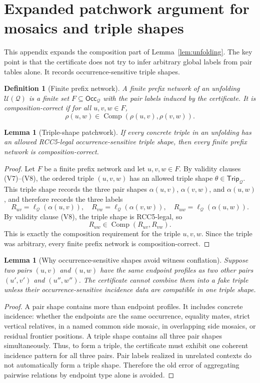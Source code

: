 \documentclass[11pt]{article}
\newtheorem{lemma}[theorem]{Lemma}
\newtheorem{definition}[theorem]{Definition}
\newcommand{\comp}{\operatorname{Comp}}
\newcommand{\Q}{\mathcal Q}
\newcommand{\U}{\mathcal U}
\newcommand{\Occ}{\mathsf{Occ}}
\newcommand{\Trip}{\mathsf{Trip}}
\begin{document}
\section{Expanded patchwork argument for mosaics and triple shapes}

This appendix expands the composition part of Lemma~\ref{lem:unfolding}.  The key point is that the certificate does not try to infer arbitrary global labels from pair tables alone.  It records occurrence-sensitive triple shapes.

\begin{definition}[Finite prefix network]
A finite prefix network of an unfolding $\U(\Q)$ is a finite set $F\subseteq\Occ_\Q$ with the pair labels induced by the certificate.  It is composition-correct if for all $u,v,w\in F$,
\[
  \rho(u,w)\in\comp(\rho(u,v),\rho(v,w)).
\]
\end{definition}

\begin{lemma}[Triple-shape patchwork]
If every concrete triple in an unfolding has an allowed RCC5-legal occurrence-sensitive triple shape, then every finite prefix network is composition-correct.
\end{lemma}

\begin{proof}
Let $F$ be a finite prefix network and let $u,v,w\in F$.  By validity clauses (V7)--(V8), the ordered triple $(u,v,w)$ has an allowed triple shape $\theta\in\Trip_\Q$.  This triple shape records the three pair shapes $\alpha(u,v)$, $\alpha(v,w)$, and $\alpha(u,w)$, and therefore records the three labels
\[
 R_{uv}=\ell_\Q(\alpha(u,v)),\quad
 R_{vw}=\ell_\Q(\alpha(v,w)),\quad
 R_{uw}=\ell_\Q(\alpha(u,w)).
\]
By validity clause (V8), the triple shape is RCC5-legal, so
\[
 R_{uw}\in\comp(R_{uv},R_{vw}).
\]
This is exactly the composition requirement for the triple $u,v,w$.  Since the triple was arbitrary, every finite prefix network is composition-correct.
\end{proof}

\begin{lemma}[Why occurrence-sensitive shapes avoid witness conflation]
Suppose two pairs $(u,v)$ and $(u,w)$ have the same endpoint profiles as two other pairs $(u',v')$ and $(u'',w'')$.  The certificate cannot combine them into a fake triple unless their occurrence-sensitive incidence data are compatible in one triple shape.
\end{lemma}

\begin{proof}
A pair shape contains more than endpoint profiles.  It includes concrete incidence: whether the endpoints are the same occurrence, equality mates, strict vertical relatives, in a named common side mosaic, in overlapping side mosaics, or residual frontier positions.  A triple shape contains all three pair shapes simultaneously.  Thus, to form a triple, the certificate must exhibit one coherent incidence pattern for all three pairs.  Pair labels realized in unrelated contexts do not automatically form a triple shape.  Therefore the old error of aggregating pairwise relations by endpoint type alone is avoided.
\end{proof}
\end{document}

